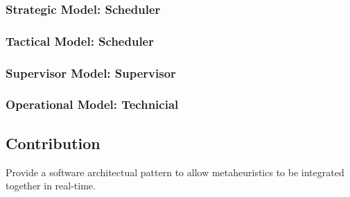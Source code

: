 \subsubsection{Strategic Model: Scheduler}

\strategicmodel

\subsubsection{Tactical Model: Scheduler}

\subsubsection{Supervisor Model: Supervisor}

\subsubsection{Operational Model: Technicial}



\subsection{Contribution}
Provide a software architectual pattern to allow metaheuristics to be integrated together in real-time.
